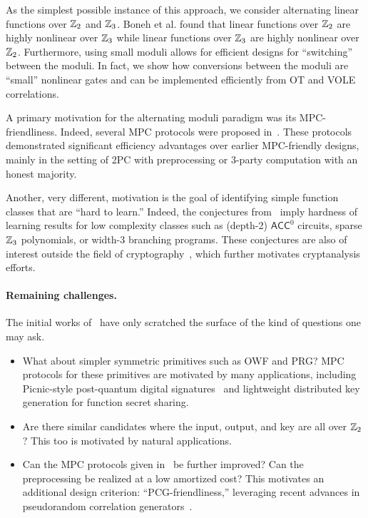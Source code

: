 As the simplest possible instance of this approach, we consider alternating linear functions over $\mathbb{Z}_2$ and $\mathbb{Z}_3$. Boneh et al. found that linear functions over $\mathbb{Z}_2$ are highly nonlinear over $\mathbb{Z}_3$ while linear functions over $\mathbb{Z}_3$ are highly nonlinear over $\mathbb{Z}_2$. Furthermore, using small moduli allows for efficient designs for ``switching'' between the moduli. In fact, we show how conversions between the moduli are “small” nonlinear gates and can be implemented efficiently from OT and VOLE correlations.
\fi

A primary motivation for the alternating moduli paradigm was its MPC-friendliness. Indeed, several MPC protocols were proposed in~\cite{boneh2018-darkmatter}. These protocols demonstrated significant efficiency advantages over earlier MPC-friendly designs, mainly in the setting of 2PC with preprocessing or 3-party computation with an honest majority. 

Another, very different, motivation is the goal of identifying simple function classes that are ``hard to learn.''  Indeed,  the conjectures from~\cite{boneh2018-darkmatter} imply hardness of learning results for low complexity classes such as (depth-2) $\mathsf{ACC}^0$ circuits, sparse $\mathbb{Z}_3$ polynomials, or width-3 branching programs. These conjectures are also of interest outside the field of cryptography~\cite{Chen19,FilmusIKK20,ChenR20,KabanetsKLMO20}, which further motivates cryptanalysis efforts.

\paragraph{Remaining challenges.} The initial works of~\cite{boneh2018-darkmatter,cheon2020-adventures} have only scratched the surface of the kind of questions one may ask. 
\begin{itemize}
\item
What about simpler symmetric primitives such as OWF and PRG? MPC protocols for these primitives are motivated by many applications, including Picnic-style post-quantum digital signatures~\cite{chase2017-picnic,kales2020-picnic} and lightweight distributed key generation for function secret sharing.
\item Are there similar candidates where the input, output, and key are all over $\mathbb{Z}_2$? This too is motivated by natural applications.
\item Can the MPC protocols given in~\cite{boneh2018-darkmatter} be further improved? Can the preprocessing be realized at a low amortized cost? This motivates an additional design criterion: ``PCG-friendliness,'' leveraging recent advances in pseudorandom correlation generators~\cite{BCGI18,BCGIKRS19,yang2020-ferret}.
\end{itemize}

